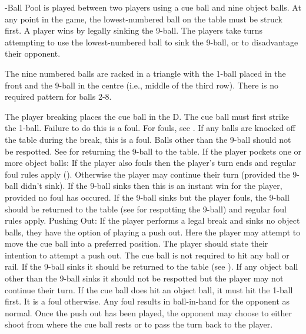 

-Ball Pool is played between two players using a cue ball and nine object balls. At any point in the game, the lowest-numbered ball on the table must be struck first. A player wins by legally sinking the 9-ball. The players take turns attempting to use the lowest-numbered ball to sink the 9-ball, or to disadvantage their opponent.%


 {}%
 \DetermineWhoRacks%
%
\subruleitem The nine numbered balls are racked in a triangle with the 1-ball placed in the front and the 9-ball in the centre (i.e., middle of the third row). There is no required pattern for balls 2-8.%
\subruleitem \TightlyPacked%
\subruleitem {}%
\subruleitem {}%
\subruleitem {}%


 The player breaking places the cue ball in the D.%
 The cue ball must first strike the 1-ball. Failure to do this is a foul. For fouls, see .%
 {}%
 \CueBallRailOffBreak%
 \CueBallSinkOffBreak%
 If any balls are knocked off the table during the break, this is a foul. Balls other than the 9-ball should not be respotted. See  for returning the 9-ball to the table.%
 If the player pockets one or more object balls:%
\subruleitem If the player also fouls then the player's turn ends and regular foul rules apply ().%
\subruleitem Otherwise the player may continue their turn (provided the 9-ball didn't sink).%
\subruleitem If the 9-ball sinks then this is an instant win for the player, provided no foul has occured.%
\subruleitem If the 9-ball sinks but the player fouls, the 9-ball should be returned to the table (see  for respotting the 9-ball) and regular foul rules apply.%
Pushing Out: If the player performs a legal break and sinks no object balls, they have the option of playing a push out.%
\subruleitem Here the player may attempt to move the cue ball into a preferred position.%
\subruleitem The player should state their intention to attempt a push out.%
\subruleitem The cue ball is not required to hit any ball or rail.%
\subruleitem If the 9-ball sinks it should be returned to the table (see ).%
\subruleitem If any object ball other than the 9-ball sinks it should not be respotted but the player may not continue their turn.%
\subruleitem If the cue ball does hit an object ball, it must hit the 1-ball first. It is a foul otherwise.%
\subruleitem Any foul results in ball-in-hand for the opponent as normal.%
\subruleitem Once the push out has been played, the opponent may choose to either shoot from where the cue ball rests or to pass the turn back to the player.%

